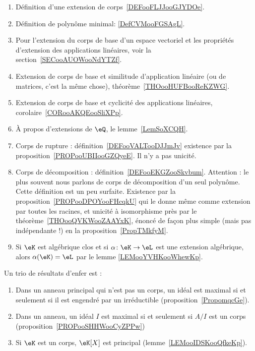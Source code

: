 
 \label{THEMEooZYKFooQXhiPD}
\begin{enumerate}
	\item
	      Définition d'une extension de corps~\ref{DEFooFLJJooGJYDOe}.
	\item
	      Définition de polynôme minimal: \ref{DefCVMooFGSAgL}.
	\item
	      Pour l'extension du corps de base d'un espace vectoriel et les propriétés d'extension des applications linéaires, voir la section~\ref{SECooAUOWooNdYTZf}.
	\item
	      Extension de corps de base et similitude d'application linéaire (ou de matrices, c'est la même chose), théorème~\ref{THOooHUFBooReKZWG}.
	\item
	      Extension de corps de base et cyclicité des applications linéaires, corolaire~\ref{CORooAKQEooSliXPp}.
	\item
	      À propos d'extensions de \( \eQ\), le lemme~\ref{LemSoXCQH}.
	\item
	      Corps de rupture : définition~\ref{DEFooVALTooDJJmJv} existence par la proposition~\ref{PROPooUBIIooGZQyeE}. Il n'y a pas unicité.
	\item
	      Corps de décomposition : définition~\ref{DEFooEKGZooSkvbum}. Attention : le plus souvent nous parlons de corps de décomposition d'un seul polynôme. Cette définition est un peu surfaite. Existence par la proposition~\ref{PROPooDPOYooFHcqkU} qui le donne même comme extension par toutes les racines, et unicité à isomorphisme près par le théorème~\ref{THOooQVKWooZAAYxK}, énoncé de façon plus simple (mais pas indépendante !) en la proposition~\ref{PropTMkfyM}.
	\item
	      Si \( \eK\) est algébrique clos et si \( \alpha\colon \eK\to \eL\) est une extension algébrique, alors \( \alpha(\eK)=\eL\) par le lemme \ref{LEMooYVHKooWhewKp}.
\end{enumerate}

Un trio de résultats d'enfer est :
\begin{enumerate}
	\item
	      Dans un anneau principal qui n'est pas un corps, un idéal est maximal si et seulement si il est engendré par un irréductible (proposition~\ref{PropomqcGe}).
	\item
	      Dans un anneau, un idéal \( I\) est maximal si et seulement si \( A/I\) est un corps (proposition~\ref{PROPooSHHWooCyZPPw})
	\item
	      Si \( \eK\) est un corps, \( \eK[X]\) est principal (lemme~\ref{LEMooIDSKooQfkeKp}).
\end{enumerate}
